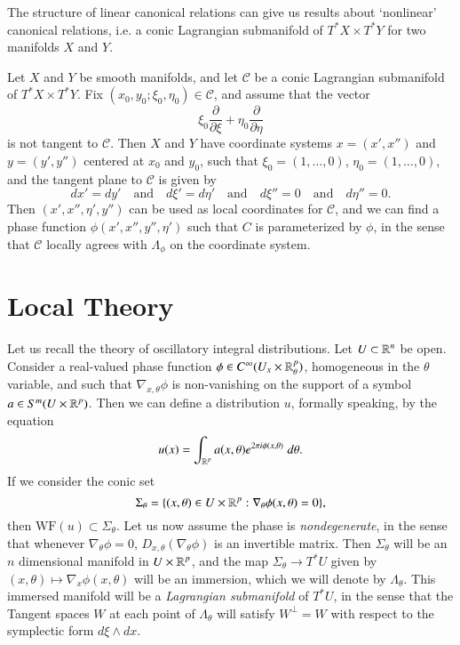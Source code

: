 The structure of linear canonical relations can give us results about `nonlinear' canonical relations, i.e. a conic Lagrangian submanifold of $T^* X \times T^* Y$ for two manifolds $X$ and $Y$.

\begin{lemma}
    Let $X$ and $Y$ be smooth manifolds, and let $\mathcal{C}$ be a conic Lagrangian submanifold of $T^* X \times T^* Y$. Fix $(x_0,y_0;\xi_0,\eta_0) \in \mathcal{C}$, and assume that the vector
    \[ \xi_0 \frac{\partial}{\partial \xi} + \eta_0 \frac{\partial}{\partial \eta} \]
    is not tangent to $\mathcal{C}$. Then $X$ and $Y$ have coordinate systems $x = (x',x'')$ and $y = (y',y'')$ centered at $x_0$ and $y_0$, such that $\xi_0 = (1,\dots,0)$, $\eta_0 = (1,\dots,0)$, and the tangent plane to $\mathcal{C}$ is given by
    \[ dx' = dy' \quad\text{and}\quad d\xi' = d\eta' \quad\text{and}\quad d\xi'' = 0 \quad\text{and}\quad d \eta'' = 0. \]
    Then $(x',x'',\eta',y'')$ can be used as local coordinates for $\mathcal{C}$, and we can find a phase function $\phi(x',x'',y'',\eta')$ such that $C$ is parameterized by $\phi$, in the sense that $\mathcal{C}$ locally agrees with $\Lambda_\phi$ on the coordinate system.
\end{lemma}

\section{Local Theory}

Let us recall the theory of oscillatory integral distributions. Let $U \subset \operatorname{\mathbb{R}}^n$ be open. Consider a real-valued phase function $\phi \in C^\infty(U_x \times \operatorname{\mathbb{R}}^p_\theta)$, homogeneous in the $\theta$ variable, and such that $\nabla_{x,\theta} \phi$ is non-vanishing on the support of a symbol $a \in S^m(U \times \operatorname{\mathbb{R}}^p)$. Then we can define a distribution $u$, formally speaking, by the equation
%
\[ u(x) = \int_{\operatorname{\mathbb{R}}^p} a(x,\theta) e^{2 \pi i \phi(x,\theta)}\; d\theta. \]
%
If we consider the conic set
%
\[ \Sigma_\theta = \{ (x,\theta) \in U \times \operatorname{\mathbb{R}}^p : \nabla_\theta \phi(x,\theta) = 0 \}, \]
%
then $\text{WF}(u) \subset \Sigma_\theta$. Let us now assume the phase is \emph{nondegenerate}, in the sense that whenever $\nabla_\theta \phi = 0$, $D_{x,\theta} (\nabla_\theta \phi)$ is an invertible matrix. Then $\Sigma_\theta$ will be an $n$ dimensional manifold in $U \times \operatorname{\mathbb{R}}^p$, and the map $\Sigma_\theta \to T^* U$ given by $(x,\theta) \mapsto \nabla_x \phi(x,\theta)$ will be an immersion, which we will denote by $\Lambda_\theta$. This immersed manifold will be a \emph{Lagrangian submanifold} of $T^* U$, in the sense that the Tangent spaces $W$ at each point of $\Lambda_\theta$ will satisfy $W^\perp = W$ with respect to the symplectic form $d\xi \wedge dx$.

